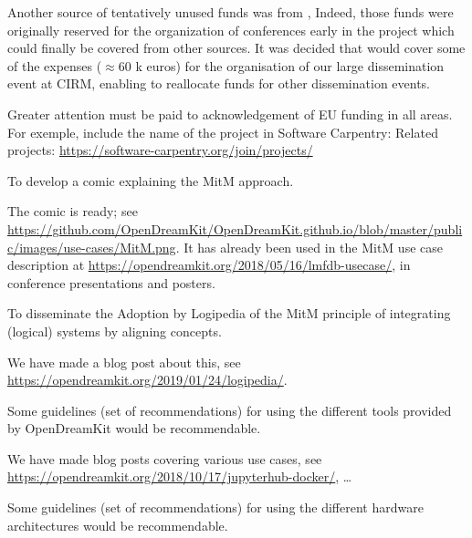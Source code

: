 Another source of tentatively unused funds was from ,
Indeed, those funds were originally reserved for the organization of
conferences early in the project which could finally be covered from
other sources. It was decided that  would cover some of
the expenses ($\approx$60 k euros) for the organisation of our large
dissemination event at CIRM, enabling  to reallocate funds
for other dissemination events.

\begin{recommendation}
  Greater attention must be paid to acknowledgement of EU funding in
  all areas. For exemple, include the name of the project in Software
  Carpentry: Related projects:
  \url{https://software-carpentry.org/join/projects/}
\end{recommendation}

\begin{recommendation}
  To develop a comic explaining the MitM approach.
\end{recommendation}
The comic is ready; see
\url{https://github.com/OpenDreamKit/OpenDreamKit.github.io/blob/master/public/images/use-cases/MitM.png}. It
has already been used in the MitM use case description at
\url{https://opendreamkit.org/2018/05/16/lmfdb-usecase/}, in conference presentations and
posters.  

\begin{recommendation}
  To disseminate the Adoption by Logipedia of the MitM principle of
  integrating (logical) systems by aligning concepts.
\end{recommendation}
We have made a blog post about this, see \url{https://opendreamkit.org/2019/01/24/logipedia/}.

\begin{recommendation}
  Some guidelines (set of recommendations) for using the different
  tools provided by OpenDreamKit would be recommendable.
\end{recommendation}
We have made blog posts covering various use cases, see
\url{https://opendreamkit.org/2018/10/17/jupyterhub-docker/}, \dots


\begin{recommendation}
  Some guidelines (set of recommendations) for using the different
  hardware architectures would be recommendable.
\end{recommendation}



